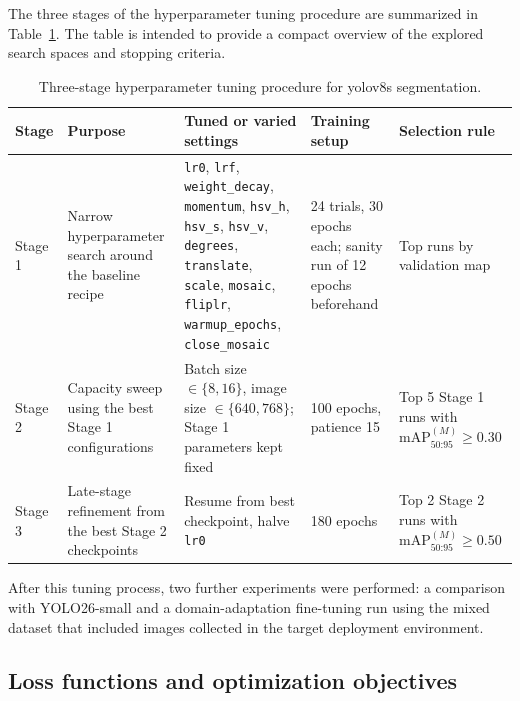 The three stages of the hyperparameter tuning procedure are summarized in
Table~\ref{tab:yolo_hparam_tuning}. The table is intended to provide a compact
overview of the explored search spaces and stopping criteria.

\begin{table}[htbp]
    \centering
    \caption{Three-stage hyperparameter tuning procedure for \gls{yolo}v8s segmentation.}
    \label{tab:yolo_hparam_tuning}
    \small
    \begin{tabular}{p{} p{} p{} p{} p{}}
        \toprule
        Stage & Purpose & Tuned or varied settings & Training setup & Selection rule \\
        \midrule
        Stage 1 &
        Narrow hyperparameter search around the baseline recipe &
        \texttt{lr0}, \texttt{lrf}, \texttt{weight\_decay}, \texttt{momentum}, \texttt{hsv\_h}, \texttt{hsv\_s}, \texttt{hsv\_v}, \texttt{degrees}, \texttt{translate}, \texttt{scale}, \texttt{mosaic}, \texttt{fliplr}, \texttt{warmup\_epochs}, \texttt{close\_mosaic} &
        24 trials, 30 epochs each; sanity run of 12 epochs beforehand &
        Top runs by validation \gls{map} \\
        Stage 2 &
        Capacity sweep using the best Stage 1 configurations &
        Batch size $\in \{8,16\}$, image size $\in \{640,768\}$; Stage 1 parameters kept fixed &
        100 epochs, patience 15 &
        Top 5 Stage 1 runs with $\mathrm{mAP}_{50\text{:}95}^{(M)} \ge 0.30$ \\
        Stage 3 &
        Late-stage refinement from the best Stage 2 checkpoints &
        Resume from best checkpoint, halve \texttt{lr0} &
        180 epochs &
        Top 2 Stage 2 runs with $\mathrm{mAP}_{50\text{:}95}^{(M)} \ge 0.50$ \\
        \bottomrule
    \end{tabular}
\end{table}

After this tuning process, two further experiments were performed:
a comparison with YOLO26-small and a domain-adaptation fine-tuning run using
the mixed dataset that included images collected in the target deployment
environment.

\subsection{Loss functions and optimization objectives}

